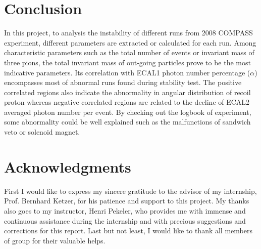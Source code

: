\section{Conclusion}
In this project, to analysis the instability of different runs from 2008 COMPASS experiment, different parameters are extracted or calculated for each run. Among characteristic parameters such as the total number of events or invariant mass of three pions, the total invariant mass of out-going particles prove to be the most indicative parameters. Its correlation with ECAL1 photon number percentage ($\alpha$) encompasses most of abnormal runs found during stability test. The positive correlated regions also indicate the abnormality in angular distribution of recoil proton whereas negative correlated regions are related to the decline of ECAL2 averaged photon number per event. By checking out the logbook of experiment, some abnormality could be well explained such as the malfunctions of sandwich veto or solenoid magnet.

\section*{Acknowledgments}
First I would like to express my sincere gratitude to the advisor of my internship, Prof. Bernhard Ketzer, for his patience and support to this project. My thanks also goes to my instructor, Henri Pekeler, who provides me with immense and continuous assistance during the internship and with precious suggestions and corrections for this report. Last but not least, I would like to thank all members of group for their valuable helps.